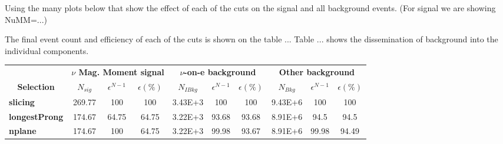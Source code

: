 Using the many plots below that show the effect of each of the cuts on the signal and all background events. (For signal we are showing NuMM=...)

The final event count and efficiency of each of the cuts is shown on the table ... Table ... shows the dissemination of background into the individual components.

\begin{table}[!hb]
\begin{tabular}{|l|ccc|ccc|ccc|}\hline
\multicolumn{1}{|c|}{}                                     & \multicolumn{3}{c|}{\textbf{$\nu$ Mag. Moment signal}}          & \multicolumn{3}{c|}{\textbf{$\nu$-on-e background}}                      & \multicolumn{3}{c|}{\textbf{Other background}}                           \\
\multicolumn{1}{|c|}{\multirow{-2}{*}{\textbf{Selection}}} & \multicolumn{1}{c}{\textbf{$N_{sig}$}} & \textbf{$\epsilon^{N-1}$} & \textbf{$\epsilon \left(\%\right)$} & \multicolumn{1}{c}{\textbf{$N_{IBkg}$}} & \textbf{$\epsilon^{N-1}$} & \textbf{$\epsilon \left(\%\right)$} & \multicolumn{1}{c}{\textbf{$N_{Bkg}$}} & \textbf{$\epsilon^{N-1}$} & \textbf{$\epsilon \left(\%\right)$} \\\hline
\textbf{slicing}      & 269.77            & 100                                                                & 100                                       & 3.43E+3               & 100                                                                 & 100                                        & 9.43E+6           & 100                                                                 & 100                                        \\
\textbf{longestProng} & 174.67            & 64.75                                                              & 64.75                                     & 3.22E+3               & 93.68                                                               & 93.68                                      & 8.91E+6           & 94.5                                                                & 94.5                                       \\
\textbf{nplane}       & 174.67            & 100                                                                & 64.75                                     & 3.22E+3               & 99.98                                                               & 93.67                                      & 8.91E+6           & 99.98                                                               & 94.49                                      \\

\end{tabular}
\end{table}
